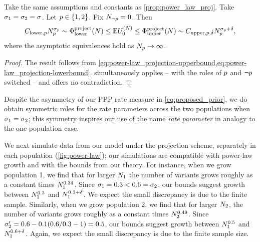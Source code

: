 \begin{myCorollary}
    \label{coro:projection_power-law-rate-align}
    Take the same assumptions and constants as \cref{prop:power_law_proj}. Take $\sigma_{1}=\sigma_{2}=\sigma_{}$. Let $p \in \{1,2\}$. Fix $N_{\neg p} = 0$. Then
    	\[
		\constantlower{\popidx}\samplesize{\popidx}^{\rate{p}} \sim \lowerboundproject(\vecsamplesize) \le \E \news{\zerovec}{\vecsamplesize} \le \upperboundproject(\vecsamplesize) \sim \constantupper{\popidx} \samplesize{\popidx}^{\rate{p}+\smallpositive},
	\]
	where the asymptotic equivalences hold as $N_{p} \to \infty$.
\end{myCorollary}
\begin{proof}
   The result follows from \cref{eq:power-law_projection-upperbound,eq:power-law_projection-lowerbound}.  simultaneously applies -- with the roles of $p$ and $\neg p$ switched -- and offers no contradiction.
\end{proof}

Despite the asymmetry of our PPP rate measure in \cref{eq:proposed_prior}, we do obtain symmetric roles for the rate
parameters across the two populations when $\sigma_{1}=\sigma_{2}$; this symmetry inspires our use of the name \emph{rate parameter} in analogy
to the one-population case.

We next simulate data from our model under the projection scheme, separately in each population (\cref{fig:power-law}); our simulations are compatible with power-law growth and with the bounds from our theory. For instance, when we grow population 1, we find that for larger $N_{1}$ the number of variants grows roughly as a constant times $N_{1}^{0.34}$. Since $\sigma_{1} = 0.3 < 0.6 = \sigma_{2}$, our bounds suggest growth between $N_{1}^{0.3}$ and $N_{1}^{0.3 + \delta}$. We expect the small discrepancy is due to the finite sample. Similarly, when we grow population 2, we find that for larger $N_{2}$, the number of variants grows roughly as a constant times $N_{2}^{0.49}$. Since $\sigma_{2}' = 0.6 - 0.1(0.6/0.3-1) = 0.5$, our bounds suggest growth between $N_{1}^{0.5}$ and $N_{1}^{0.6 + \delta}$. Again, we expect the small discrepancy is due to the finite sample size.


